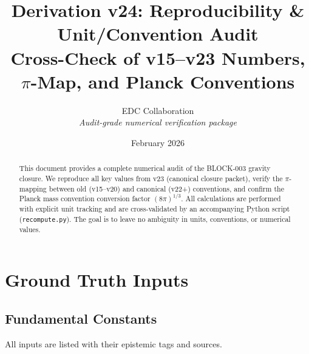 \documentclass[11pt,a4paper]{article}
\title{Derivation v24: Reproducibility \& Unit/Convention Audit\\
\large Cross-Check of v15--v23 Numbers, $\pi$-Map, and Planck Conventions}
\author{EDC Collaboration\\[3pt]
\small\textit{Audit-grade numerical verification package}}
\date{February 2026}
\begin{document}
\maketitle

\begin{abstract}
This document provides a complete numerical audit of the BLOCK-003 gravity closure.
We reproduce all key values from v23 (canonical closure packet), verify the $\pi$-mapping
between old (v15--v20) and canonical (v22+) conventions, and confirm the Planck mass
convention conversion factor $(8\pi)^{1/3}$. All calculations are performed with explicit
unit tracking and are cross-validated by an accompanying Python script (\texttt{recompute.py}).
The goal is to leave no ambiguity in units, conventions, or numerical values.
\end{abstract}

\tableofcontents
\newpage

\section{Ground Truth Inputs}

\subsection{Fundamental Constants}

All inputs are listed with their epistemic tags and sources.
\end{document}
